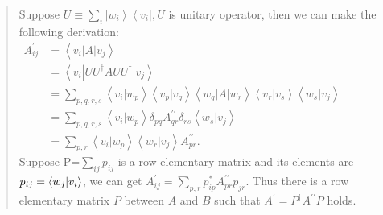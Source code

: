 \documentclass[UTF8]{ctexart}
\begin{document}
\begin{quote}
Suppose  $U \equiv \sum_{i}\left|w_{i}\right\rangle\left\langle v_{i}\right|, U$ is  unitary operator, then we can make the following derivation: \\
	$\begin{aligned} A_{i j}^{\prime} &=\left\langle v_{i}|A| v_{j}\right\rangle \\ &=\left\langle v_{i}\left|U U^{\dagger} A UU^{\dagger}\right| v_{j}\right\rangle \\ &=\sum_{p, q, r, s}\left\langle v_{i} | w_{p}\right\rangle\left\langle v_{p} | v_{q}\right\rangle\left\langle w_{q}|A| w_{r}\right\rangle\left\langle v_{r} | v_{s}\right\rangle\left\langle w_{s} | v_{j}\right\rangle \\ &=\sum_{p, q, r, s}\left\langle v_{i} | w_{p}\right\rangle \delta_{p q} A_{q r}^{\prime \prime} \delta_{r s}\left\langle w_{s} | v_{j}\right\rangle \\ &=\sum_{p, r}\left\langle v_{i} | w_{p}\right\rangle\left\langle w_{r} | v_{j}\right\rangle A_{p r}^{\prime \prime}. \end{aligned}$ 
	\\
	Suppose P=$\sum_{i j}p_{i j}$ is a row elementary matrix and its elements are $p_{i j}= \bra{w_j}\ket{v_{i}}$, we can get  $A_{ij}^{\prime}=\sum_{p, r}p_{ip}^{*}A_{p r}^{\prime \prime}p_{jr}$.  Thus there is a row elementary matrix $P$ between $A$ and $B$ such that $A^{\prime}=P^{\dagger} A^{\prime\prime} P$ holds.
	
	
\end{quote}
\end{document}
